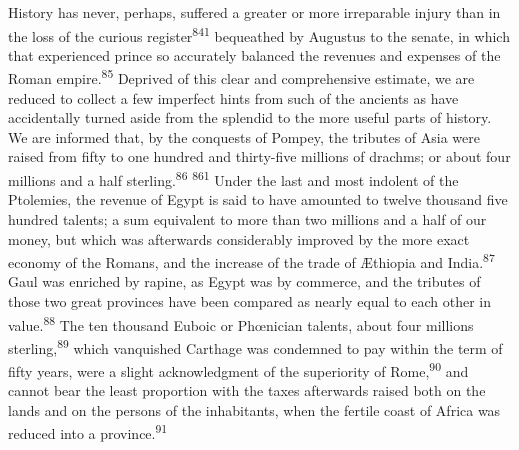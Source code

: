 

History has never, perhaps, suffered a greater or more
irreparable injury than in the loss of the curious register\textsuperscript{841}
bequeathed by Augustus to the senate, in which that experienced
prince so accurately balanced the revenues and expenses of the
Roman empire.\textsuperscript{85} Deprived of this clear and comprehensive
estimate, we are reduced to collect a few imperfect hints from
such of the ancients as have accidentally turned aside from the
splendid to the more useful parts of history. We are informed
that, by the conquests of Pompey, the tributes of Asia were
raised from fifty to one hundred and thirty-five millions of
drachms; or about four millions and a half sterling.\textsuperscript{86} \textsuperscript{861} Under
the last and most indolent of the Ptolemies, the revenue of Egypt
is said to have amounted to twelve thousand five hundred talents;
a sum equivalent to more than two millions and a half of our
money, but which was afterwards considerably improved by the more
exact economy of the Romans, and the increase of the trade of
Æthiopia and India.\textsuperscript{87} Gaul was enriched by rapine, as Egypt was
by commerce, and the tributes of those two great provinces have
been compared as nearly equal to each other in value.\textsuperscript{88} The ten
thousand Euboic or Phœnician talents, about four millions
sterling,\textsuperscript{89} which vanquished Carthage was condemned to pay
within the term of fifty years, were a slight acknowledgment of
the superiority of Rome,\textsuperscript{90} and cannot bear the least proportion
with the taxes afterwards raised both on the lands and on the
persons of the inhabitants, when the fertile coast of Africa was
reduced into a province.\textsuperscript{91}




